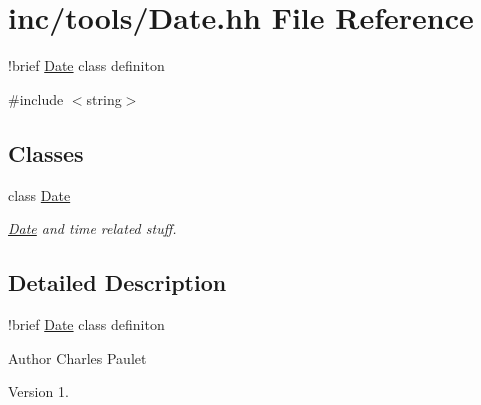 \hypertarget{Date_8hh}{}\section{inc/tools/\+Date.hh File Reference}
\label{Date_8hh}


!brief \hyperlink{classDate}{Date} class definiton  


{\ttfamily \#include $<$string$>$}\newline
\subsection*{Classes}
\begin{DoxyCompactItemize}
\item 
class \hyperlink{classDate}{Date}
\begin{DoxyCompactList}\small\item\em \hyperlink{classDate}{Date} and time related stuff. \end{DoxyCompactList}\end{DoxyCompactItemize}


\subsection{Detailed Description}
!brief \hyperlink{classDate}{Date} class definiton 

\begin{DoxyAuthor}{Author}
Charles Paulet 
\end{DoxyAuthor}
\begin{DoxyVersion}{Version}
1. 
\end{DoxyVersion}
